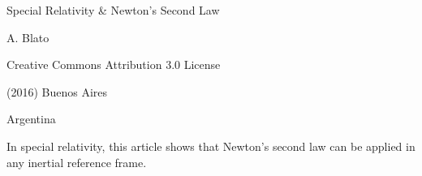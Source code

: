 \documentclass[10pt,fleqn]{article}
\begin{document}
\begin{center}

{\fontsize{10.98}{10.98}\selectfont \sc Special Relativity \hspace{+0.06em}\&\hspace{+0.06em} Newton's Second Law}

\bigskip \medskip

{A. Blato}

\bigskip \medskip

\small

Creative Commons Attribution 3.0 License

\smallskip

(2016) Buenos Aires

\medskip

Argentina

\smallskip

\bigskip \medskip

\parbox{81.00mm}{In special relativity, this article shows that Newton's second law can be applied in any inertial reference frame.}

\end{center}

\normalsize

\vspace{-1.20em}

\par {}

\bigskip \smallskip
\end{document}
